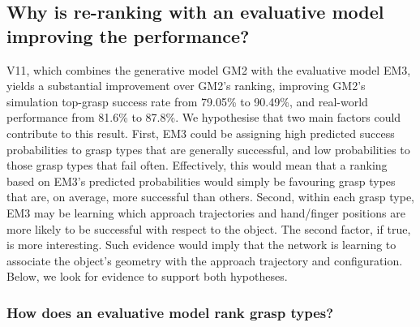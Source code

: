 \subsection{Why is re-ranking with an evaluative model improving the performance?}
\noindent

V11, which combines the generative model GM2 with the evaluative model EM3, yields a substantial improvement over GM2's ranking, improving GM2's simulation top-grasp success rate from 79.05\% to 90.49\%, and real-world performance from 81.6\% to 87.8\%. We hypothesise that two main factors could contribute to this result. First, EM3 could be assigning high predicted success probabilities to grasp types that are generally successful, and low probabilities to those grasp types that fail often. Effectively, this would mean that a ranking based on EM3's predicted probabilities would simply be favouring grasp types that are, on average, more successful than others. Second, within each grasp type, EM3 may be learning which approach trajectories and hand/finger positions are more likely to be successful with respect to the object. The second factor, if true, is more interesting. Such evidence would imply that the network is learning to associate the object's geometry with the approach trajectory and configuration. Below, we look for evidence to support both hypotheses.

\subsubsection{How does an evaluative model rank grasp types?}
\noindent


